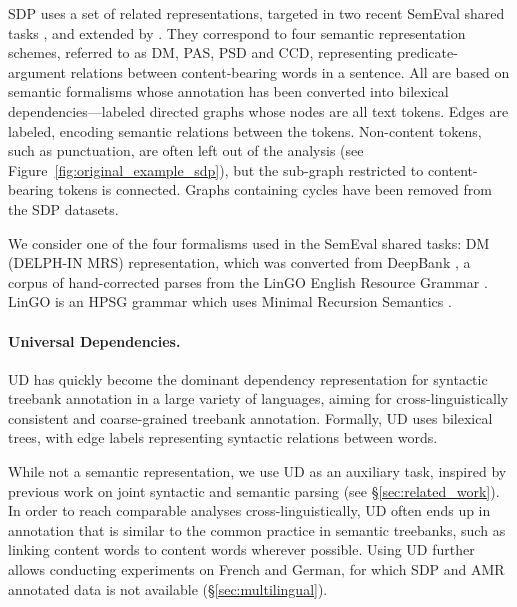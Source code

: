 \documentclass[11pt,a4paper]{article}
\begin{document}
SDP uses a set of related representations, targeted in two recent SemEval shared tasks 
\cite{oepen2014semeval,oepen2015semeval}, and extended by \citet{oepen2016towards}.
They correspond to four semantic representation schemes, referred to as
DM, PAS, PSD and CCD, representing
predicate-argument relations between content-bearing words in a sentence.
All are based on semantic formalisms whose annotation has been
converted into bilexical dependencies---labeled
directed graphs whose nodes are all text tokens.
Edges are labeled, encoding semantic relations between the tokens.
Non-content tokens, such as punctuation,
are often left out of the analysis (see Figure~\ref{fig:original_example_sdp}),
but the sub-graph restricted to content-bearing tokens is connected.
Graphs containing cycles have been removed from the SDP datasets.

We consider one of the four formalisms used
in the SemEval shared tasks: DM (DELPH-IN MRS) representation, which was converted from 
DeepBank \cite{flickinger2012deepbank}, a corpus of hand-corrected parses from the LinGO
English Resource Grammar \cite{copestake2000open}.
LinGO is an HPSG grammar \cite{pollard1994head}
which uses Minimal Recursion Semantics \cite{copestake2005minimal}.


\paragraph{Universal Dependencies.}\label{sec:ud}
UD \cite{nivre2016universal,11234/1-2515} has quickly become
the dominant dependency representation for
syntactic treebank annotation in a large variety of languages,
aiming for cross-linguistically consistent and coarse-grained treebank
annotation. Formally, UD uses bilexical trees, with edge labels 
representing syntactic relations between words.

While not a semantic representation,
we use UD as an auxiliary task,
inspired by previous work on joint syntactic and semantic parsing
(see \S\ref{sec:related_work}).
In order to reach comparable analyses cross-linguistically,
UD often ends up in annotation that is similar to the common practice
in semantic treebanks, such as linking content words to content words wherever possible.
Using UD further allows conducting experiments on French and German, 
for which SDP and AMR annotated data is not available (\S\ref{sec:multilingual}).
\end{document}
